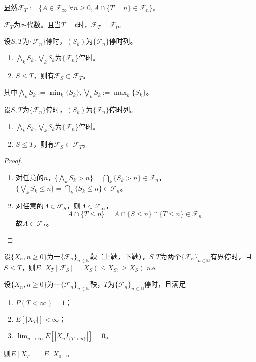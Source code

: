 \documentclass[lang=cn,10pt,thmcnt=section]{elegantbook}
\begin{document}
显然$\mathcal{F}_T := \{A \in \mathcal{F}_\infty | \forall n \geq 0, A \cap \{T = n\} \in \mathcal{F}_n\}$。

$\mathcal{F}_T$为$\sigma$-代数。且当$T = t$时，$\mathcal{F}_T = \mathcal{F}_t$。
\begin{theorem}
	设$S, T$为$\{\mathcal{F}_n\}$停时，$(S_k)$为$\{\mathcal{F}_n\}$停时列。
\begin{enumerate}
    \item $\bigwedge_k S_k, \bigvee_k S_k$为$\{\mathcal{F}_n\}$停时。
    \item $S \leq T$，则有$\mathcal{F}_S \subset \mathcal{F}_T$。
\end{enumerate}
其中$\bigwedge_k S_k := \min_k \{S_k\}, \bigvee_k S_k := \max_k \{S_k\}$。
\end{theorem}
\begin{theorem}
	设$S, T$为$\{\mathcal{F}_n\}$停时，$(S_k)$为$\{\mathcal{F}_n\}$停时列。
\begin{enumerate}
    \item $\bigwedge_k S_k, \bigvee_k S_k$为$\{\mathcal{F}_n\}$停时。
    \item $S \leq T$，则有$\mathcal{F}_S \subset \mathcal{F}_T$。
\end{enumerate}

\end{theorem}
\begin{proof}
	\begin{enumerate}
		\item 对任意的$n$，$\{\bigwedge_k S_k > n\} = \bigcap_k \{S_k > n\} \in \mathcal{F}_n$，$\{\bigvee_k S_k \leq n\} = \bigcap_k \{S_k \leq n\} \in \mathcal{F}_n$。
		\item 对任意的$A \in \mathcal{F}_S$，则$A \in \mathcal{F}_\infty$，
		\[
		A \cap \{T \leq n\} = A \cap \{S \leq n\} \cap \{T \leq n\} \in \mathcal{F}_n
		\]
		故$A \in \mathcal{F}_T$。
	\end{enumerate}
\end{proof}
\begin{theorem}
	设$\{X_n, n \geq 0\}$为一$\{\mathcal{F}_n\}_{n \in \mathbb{N}}$鞅（上鞅，下鞅），$S, T$为两个$\{\mathcal{F}_n\}_{n \in \mathbb{N}}$有界停时，且$S \leq T$，则$E[X_T \mid \mathcal{F}_S] = X_S (\leq X_S, \geq X_S)$ a.e.
\end{theorem}
\begin{theorem}[停止定理]
	设$\{X_n, n \geq 0\}$为一$\{\mathcal{F}_n\}_{n \in \mathbb{N}}$鞅，$T$为$\{\mathcal{F}_n\}_{n \in \mathbb{N}}$停时，且满足
\begin{enumerate}
    \item $P(T < \infty) = 1$；
    \item $E[|X_T|] < \infty$；
    \item $\lim_{n \to \infty} E[|X_n I_{\{T > n\}}|] = 0$。
\end{enumerate}
则$E[X_T] = E[X_0]$。
\end{theorem}
\end{document}

